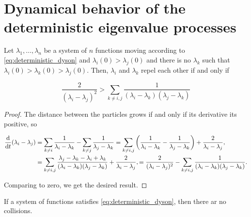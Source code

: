 \section{Dynamical behavior of the deterministic eigenvalue processes}

\begin{lemma} \label{lemma:separation}
    Let $\lambda_1,\dots,\lambda_n$ be a system of $n$ functions moving according to \eqref{eq:deterministic_dyson} and $\lambda_i(0) > \lambda_j(0)$ and there is no $\lambda_k$ such that $\lambda_i(0) > \lambda_k(0) > \lambda_j(0)$. Then, $\lambda_i$ and $\lambda_k$ repel each other if and only if 

    \begin{equation} \label{eq:separation_condition}
        \frac{2}{(\lambda_i - \lambda_j)^2} > \sum_{k\neq i,j} \frac{1}{(\lambda_i - \lambda_k)(\lambda_j - \lambda_k)}
    \end{equation}
\end{lemma}

\begin{proof}

    The distance between the particles grows if and only if its derivative its positive, so 

    \begin{align*}
        \frac{\mathrm d }{\mathrm d t} (\lambda_i - \lambda_j) &= \sum_{k\neq i} \frac{1}{\lambda_i - \lambda_k} - \sum_{k\neq j} \frac{1}{\lambda_j - \lambda_k} = \sum_{k\neq i,j} \left( \frac{1}{\lambda_i - \lambda_k} - \frac{1}{\lambda_j - \lambda_k} \right) + \frac{2}{\lambda_i - \lambda_j},\\
        &= \sum_{k \neq i, j} \frac{\lambda_j - \lambda_k - \lambda_i + \lambda_k}{(\lambda_i- \lambda_k)(\lambda_j - \lambda_k)} + \frac{2}{\lambda_i - \lambda_j},= \frac{2}{(\lambda_i - \lambda_j)^2} - \sum_{k\neq i,j} \frac{1}{(\lambda_i - \lambda_k)(\lambda_j - \lambda_k)}.
    \end{align*}

    Comparing to zero, we get the desired result.
\end{proof}



\begin{theorem}
    If a system of functions satisfies \eqref{eq:deterministic_dyson}, then there ar no collisions.
\end{theorem}


